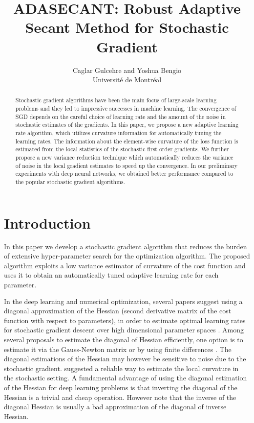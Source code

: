 \documentclass{article}
\title{ADASECANT: Robust Adaptive Secant Method for Stochastic Gradient}
\author{
Caglar Gulcehre and Yoshua Bengio\\
Universit\'e de Montr\'eal \\
}
\begin{document}
\maketitle


\begin{abstract}
    Stochastic gradient algorithms have been the main focus of large-scale learning problems and 
    they led to impressive successes in machine learning. The convergence of SGD depends on the
    careful choice of learning rate and the amount of the noise in stochastic estimates of the gradients. 
    In this paper, we propose a new adaptive learning rate algorithm, which utilizes curvature information 
    for automatically tuning the learning rates. The information about the element-wise 
    curvature of the loss function is estimated from the local statistics of the stochastic first order
    gradients. We further propose a new variance reduction technique which automatically reduces the variance 
    of noise in the local gradient estimates to speed up the convergence. In our preliminary experiments with deep
    neural networks, we obtained better performance compared to the popular stochastic gradient algorithms.
\end{abstract}

\section{Introduction}

In  this paper we develop a stochastic gradient algorithm that reduces the burden of extensive 
hyper-parameter search for the optimization algorithm. The proposed algorithm exploits
a low variance estimator of curvature of the cost function and uses it to obtain an
automatically tuned adaptive learning rate for each parameter.

In the deep learning and numerical optimization, several papers suggest using a diagonal
approximation of the Hessian (second derivative matrix of the cost function with respect to
parameters), in order to estimate optimal learning rates for stochastic gradient descent over high dimensional
parameter spaces \citep{becker1988improving,schaul2012no,lecun1993automatic}. Among several proposals to estimate
the diagonal of Hessian efficiently, one option is to estimate it via the Gauss-Newton matrix \citep{lecun2012efficient} or 
by using finite differences \citep{schaul2013adaptive}. The diagonal estimations of the Hessian may however
be sensitive to noise due to the stochastic gradient.  \cite{schaul2012no} suggested a reliable 
way to estimate the local curvature in the stochastic setting. A fundamental advantage of using 
the diagonal estimation of the Hessian for deep learning problems is
that inverting the diagonal of the Hessian is a trivial and cheap operation. 
However note that the inverse of the diagonal Hessian is usually a bad approximation of the 
diagonal of inverse Hessian.
\end{document}
